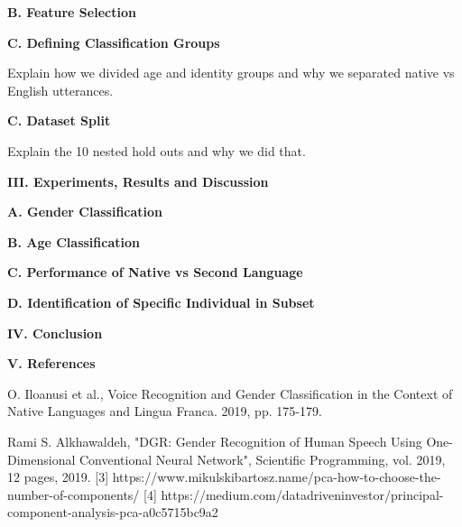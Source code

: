 \documentclass{article}
\begin{document}
\vspace{2mm}
\textbf{ B. Feature Selection }\par

\vspace{2mm}
\textbf{ C. Defining Classification Groups }\par
Explain how we divided age and identity groups and why we separated native vs English utterances. 

\vspace{2mm}
\textbf{ C. Dataset Split }\par
Explain the 10 nested hold outs and why we did that.

\vspace{2mm}
\textbf{III. Experiments, Results and Discussion }\par

\vspace{2mm}
\textbf{ A. Gender Classification }\par

\vspace{2mm}
\textbf{ B. Age Classification }\par

\vspace{2mm}
\textbf{ C. Performance of Native vs Second Language }\par

\vspace{2mm}
\textbf{ D. Identification of Specific Individual in Subset }\par

\vspace{2mm}
\textbf{IV. Conclusion }\par


\vspace{2mm}
\textbf{V. References}\par
[1]	O. Iloanusi et al., Voice Recognition and Gender Classification in the Context of Native Languages and Lingua Franca. 2019, pp. 175-179.\par
[2] Rami S. Alkhawaldeh, "DGR: Gender Recognition of Human Speech Using One-Dimensional Conventional Neural Network", Scientific Programming, vol. 2019, 12 pages, 2019.
[3] https://www.mikulskibartosz.name/pca-how-to-choose-the-number-of-components/
[4] https://medium.com/datadriveninvestor/principal-component-analysis-pca-a0c5715bc9a2
\end{document}
